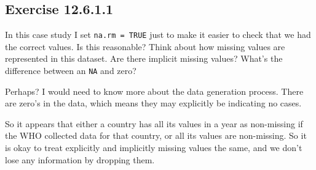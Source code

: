 \documentclass[]{book}
\newenvironment{Shaded}{\begin{snugshade}}{\end{snugshade}}
\newcommand{\CommentTok}[1]{\textcolor[rgb]{0.56,0.35,0.01}{\textit{#1}}}
\newcommand{\DataTypeTok}[1]{\textcolor[rgb]{0.13,0.29,0.53}{#1}}
\newcommand{\DecValTok}[1]{\textcolor[rgb]{0.00,0.00,0.81}{#1}}
\newcommand{\KeywordTok}[1]{\textcolor[rgb]{0.13,0.29,0.53}{\textbf{#1}}}
\newcommand{\NormalTok}[1]{#1}
\newcommand{\OperatorTok}[1]{\textcolor[rgb]{0.81,0.36,0.00}{\textbf{#1}}}
\newcommand{\StringTok}[1]{\textcolor[rgb]{0.31,0.60,0.02}{#1}}
\theoremstyle{plain}
\theoremstyle{remark}
\begin{document}
\hypertarget{exercise-12.6.1.1}{%
\subsection*{\texorpdfstring{Exercise
{12.6.1.1}}{Exercise 12.6.1.1}}\label{exercise-12.6.1.1}}

In this case study I set \texttt{na.rm\ =\ TRUE} just to make it easier
to check that we had the correct values. Is this reasonable? Think about
how missing values are represented in this dataset. Are there implicit
missing values? What's the difference between an \texttt{NA} and zero?

Perhaps? I would need to know more about the data generation process.
There are zero's in the data, which means they may explicitly be
indicating no cases.

\begin{Shaded}
\end{Shaded}

So it appears that either a country has all its values in a year as
non-missing if the WHO collected data for that country, or all its
values are non-missing. So it is okay to treat explicitly and implicitly
missing values the same, and we don't lose any information by dropping
them.

\begin{Shaded}
\end{Shaded}
\end{document}

